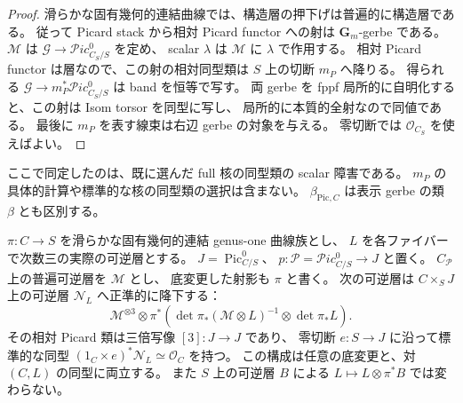 \begin{proof}
滑らかな固有幾何的連結曲線では、構造層の押下げは普遍的に構造層である。
従って Picard stack から相対 Picard functor への射は
$\mathbf G_m$-gerbe である\cite{NFMStacksPicardGerbe}。
$\mathcal M$ は $\mathcal G\to\mathscr{P}ic^0_{C_S/S}$ を定め、
scalar $\lambda$ は $\mathcal M$ に $\lambda$ で作用する。
相対 Picard functor は層なので、この射の相対同型類は $S$ 上の切断 $m_P$ へ降りる。
得られる $\mathcal G\to m_P^*\mathscr{P}ic^0_{C_S/S}$ は band を恒等で写す。
両 gerbe を fppf 局所的に自明化すると、この射は Isom torsor を同型に写し、
局所的に本質的全射なので同値である。
最後に $m_P$ を表す線束は右辺 gerbe の対象を与える。
零切断では $\mathcal O_{C_S}$ を使えばよい。
\end{proof}

ここで同定したのは、既に選んだ full 核の同型類の scalar 障害である。
$m_P$ の具体的計算や標準的な核の同型類の選択は含まない。
$\beta_{\mathrm{Pic},C}$ は表示 gerbe の類 $\beta$ とも区別する。

\begin{lemma}
\label{lem:nfm-picard-tripling-line}
$\pi:C\to S$ を滑らかな固有幾何的連結 genus-one 曲線族とし、
$L$ を各ファイバーで次数三の実際の可逆層とする。
$J=\operatorname{Pic}^0_{C/S}$、
$p:\mathscr P=\mathscr{P}ic^0_{C/S}\to J$ と置く。
$C_{\mathscr P}$ 上の普遍可逆層を $\mathscr M$ とし、
底変更した射影も $\pi$ と書く。
次の可逆層は $C\times_SJ$ 上の可逆層 $\mathscr N_L$ へ正準的に降下する：
\begin{equation}
\label{eq:nfm-picard-tripling-line}
 \mathscr M^{\otimes3}\otimes
 \pi^*\!\left(
   \det\pi_*(\mathscr M\otimes L)^{-1}
       \otimes\det\pi_*L\right).
\end{equation}
その相対 Picard 類は三倍写像 $[3]:J\to J$ であり、
零切断 $e:S\to J$ に沿って標準的な同型
$(1_C\times e)^*\mathscr N_L\simeq\mathcal O_C$ を持つ。
この構成は任意の底変更と、対 $(C,L)$ の同型に両立する。
また $S$ 上の可逆層 $B$ による $L\mapsto L\otimes\pi^*B$ では変わらない。
\end{lemma}

